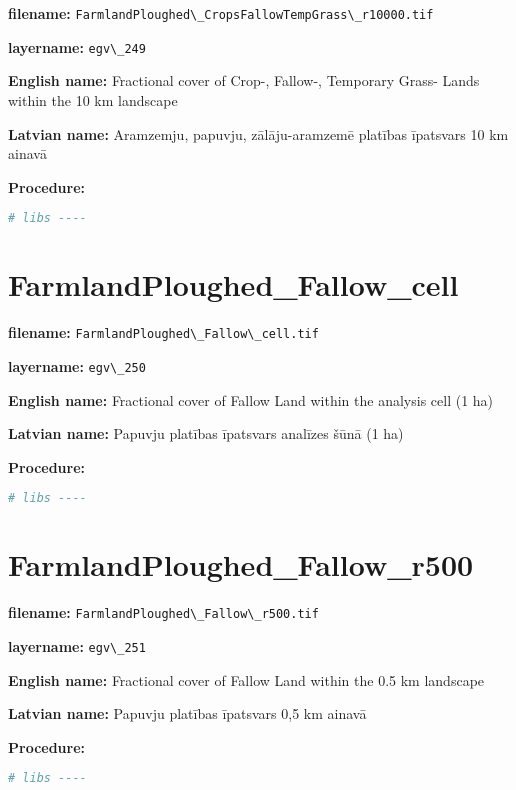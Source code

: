 \documentclass[
]{book}
\newcommand{\passthrough}[1]{#1}
\begin{document}
\textbf{filename:} \passthrough{\lstinline!FarmlandPloughed\_CropsFallowTempGrass\_r10000.tif!}

\textbf{layername:} \passthrough{\lstinline!egv\_249!}

\textbf{English name:} Fractional cover of Crop-, Fallow-, Temporary Grass- Lands within the 10 km landscape

\textbf{Latvian name:} Aramzemju, papuvju, zālāju-aramzemē platības īpatsvars 10 km ainavā

\textbf{Procedure:}

\begin{lstlisting}[language=R]
# libs ----
\end{lstlisting}

\section{FarmlandPloughed\_Fallow\_cell}\label{ch06.250}

\textbf{filename:} \passthrough{\lstinline!FarmlandPloughed\_Fallow\_cell.tif!}

\textbf{layername:} \passthrough{\lstinline!egv\_250!}

\textbf{English name:} Fractional cover of Fallow Land within the analysis cell (1 ha)

\textbf{Latvian name:} Papuvju platības īpatsvars analīzes šūnā (1 ha)

\textbf{Procedure:}

\begin{lstlisting}[language=R]
# libs ----
\end{lstlisting}

\section{FarmlandPloughed\_Fallow\_r500}\label{ch06.251}

\textbf{filename:} \passthrough{\lstinline!FarmlandPloughed\_Fallow\_r500.tif!}

\textbf{layername:} \passthrough{\lstinline!egv\_251!}

\textbf{English name:} Fractional cover of Fallow Land within the 0.5 km landscape

\textbf{Latvian name:} Papuvju platības īpatsvars 0,5 km ainavā

\textbf{Procedure:}

\begin{lstlisting}[language=R]
# libs ----
\end{lstlisting}
\end{document}
